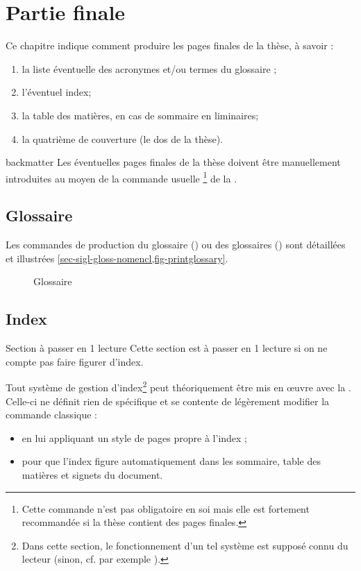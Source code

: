 \chapter{Partie finale}\label{cha-pages-finales}

Ce chapitre indique comment produire les pages finales de la thèse,
à savoir :
\begin{enumerate}
\item la liste éventuelle des acronymes et/ou
  termes du glossaire ;
\item l'éventuel index;
\item la table des matières, en cas de sommaire en \glspl{liminaire};
\item la quatrième de couverture (le dos de la thèse).
\end{enumerate}

\begin{docCommand}{backmatter}{}
  Les éventuelles pages finales de la thèse doivent être manuellement
  introduites au moyen de la commande usuelle
  \footnote{Cette commande n'est pas obligatoire en
    soi mais elle est fortement recommandée si la thèse contient des pages
    finales.} de la \nofrontmatter.
\end{docCommand}

\section{Glossaire}

Les commandes de production du glossaire () ou
des glossaires () sont détaillées et illustrées
\vref{sec-sigl-gloss-nomencl,fig-printglossary}.

\begin{figure}[htbp]
  \centering
  \caption{Glossaire}
  \label{fig-printglossary}
\end{figure}

\section{Index}

\begin{dbremark*}{Section à passer en 1\iere{} lecture}
  Cette section est à passer en 1\iere{} lecture si on ne compte pas faire
  figurer d'index.
\end{dbremark*}

Tout système de gestion d'index\footnote{Dans cette section, le fonctionnement
  d'un tel système est supposé connu du lecteur (sinon, cf. par exemple
  \cite{en-ligne7}).} peut théoriquement être mis en œuvre avec la
\yatCl. Celle-ci ne définit rien de spécifique et se contente de légèrement
modifier la commande  classique :
\begin{itemize}
\item en lui appliquant un style de pages propre à l'index ;
\item pour que l'index figure automatiquement dans les
  sommaire, table des matières et signets du document.
\end{itemize}

